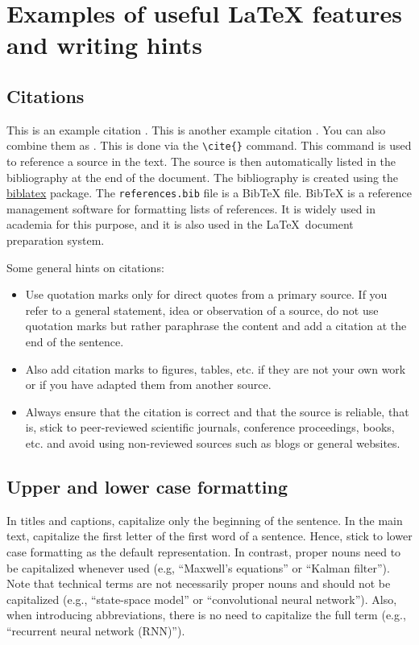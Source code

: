 \chapter{Examples of useful LaTeX features and writing hints} 
\label{cha:hints}

\section{Citations}
\label{sec:citations}
This is an example citation \cite{WaBo2016}. This is another example citation \cite{wallscheid2014real}. You can also combine them as \cite{WaBo2016,wallscheid2014real}. This is done via the \verb|\cite{}| command. This command is used to reference a source in the text. The source is then automatically listed in the bibliography at the end of the document. The bibliography is created using the \href{https://ctan.org/pkg/biblatex}{biblatex} package. The \texttt{references.bib} file is a BibTeX file. BibTeX is a reference management software for formatting lists of references. It is widely used in academia for this purpose, and it is also used in the \LaTeX\ document preparation system.

Some general hints on citations:
\begin{itemize}
	\item Use quotation marks only for direct quotes from a primary source. If you refer to a general statement, idea or observation of a source, do not use quotation marks but rather paraphrase the content and add a citation at the end of the sentence.
	\item Also add citation marks to figures, tables, etc. if they are not your own work or if you have adapted them from another source.
	\item Always ensure that the citation is correct and that the source is reliable, that is, stick to peer-reviewed scientific journals, conference proceedings, books, etc. and avoid using non-reviewed sources such as blogs or general websites.
\end{itemize}



\section{Upper and lower case formatting}
\label{sec:formatting}
 In titles and captions, capitalize only the beginning of the sentence. In the main text, capitalize the first letter of the first word of a sentence. Hence, stick to lower case formatting as the default representation. In contrast, proper nouns need to be capitalized whenever used (e.g, ``Maxwell's equations'' or ``Kalman filter''). Note that technical terms are not necessarily proper nouns and should not be capitalized (e.g., ``state-space model'' or ``convolutional neural network''). Also, when introducing abbreviations, there is no need to capitalize the full term (e.g., ``recurrent neural network (RNN)'').

